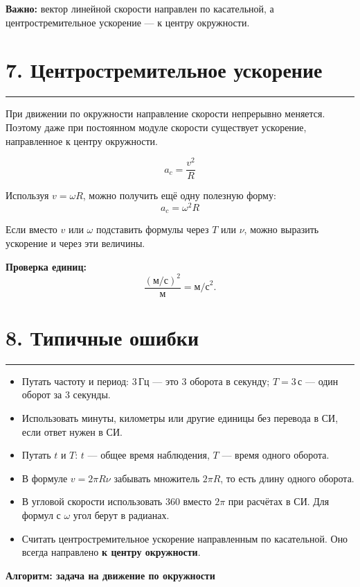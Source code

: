 \documentclass[a4paper,12pt]{article}
\newcommand{\sectionrule}{\par\vspace{0.25em}\noindent\color{accent}\rule{\linewidth}{0.55pt}\color{textgray}\par\vspace{0.25em}}
\newcommand{\key}[1]{\textbf{\color{darkaccent}#1}}
\newcommand{\formula}[1]{\[\boxed{#1}\]}
\newcommand{\Hz}{\,\text{Гц}}
\newcommand{\secnd}{\,\text{с}}
\begin{document}
\key{Важно:} вектор линейной скорости направлен по касательной, а центростремительное ускорение — к центру окружности.

\clearpage
\section*{7. Центростремительное ускорение}
\sectionrule

При движении по окружности направление скорости непрерывно меняется. Поэтому даже при постоянном модуле скорости существует ускорение, направленное к центру окружности.

\formula{a_c=\frac{v^2}{R}}

Используя $v=\omega R$, можно получить ещё одну полезную форму:
\formula{a_c=\omega^2R}

Если вместо $v$ или $\omega$ подставить формулы через $T$ или $\nu$, можно выразить ускорение и через эти величины.

\key{Проверка единиц:}
\[
\frac{(\text{м/с})^2}{\text{м}}=\text{м/с}^2.
\]

\section*{8. Типичные ошибки}
\sectionrule
\begin{itemize}
  \item Путать частоту и период: $3\Hz$ — это 3 оборота в секунду; $T=3\secnd$ — один оборот за 3 секунды.
  \item Использовать минуты, километры или другие единицы без перевода в СИ, если ответ нужен в СИ.
  \item Путать $t$ и $T$: $t$ — общее время наблюдения, $T$ — время одного оборота.
  \item В формуле $v=2\pi R\nu$ забывать множитель $2\pi R$, то есть длину одного оборота.
  \item В угловой скорости использовать $360$ вместо $2\pi$ при расчётах в СИ. Для формул с $\omega$ угол берут в радианах.
  \item Считать центростремительное ускорение направленным по касательной. Оно всегда направлено \key{к центру окружности}.
\end{itemize}

\clearpage
\thispagestyle{plain}
\begin{center}
{\LARGE\bfseries\color{darkaccent}Алгоритм: задача на движение по окружности}
\end{center}
\vspace{8mm}
\end{document}
